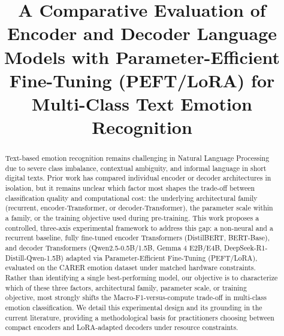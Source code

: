 \documentclass[conference]{IEEEtran}
\begin{document}
\title{A Comparative Evaluation of Encoder and Decoder Language Models with Parameter-Efficient Fine-Tuning (PEFT/LoRA) 
for Multi-Class Text Emotion Recognition
}

\author{
\and
{}
\and
{}
}

\maketitle

\begin{abstract}
Text-based emotion recognition remains challenging in Natural Language Processing due to severe class imbalance, contextual ambiguity, and informal language in short digital texts. Prior work has compared individual encoder or decoder architectures in isolation, but it remains unclear which factor most shapes the trade-off between classification quality and computational cost: the underlying architectural family (recurrent, encoder-Transformer, or decoder-Transformer), the parameter scale within a family, or the training objective used during pre-training. This work proposes a controlled, three-axis experimental framework to address this gap: a non-neural and a recurrent baseline, fully fine-tuned encoder Transformers (DistilBERT, BERT-Base), and decoder Transformers (Qwen2.5-0.5B/1.5B, Gemma 4 E2B/E4B, DeepSeek-R1-Distill-Qwen-1.5B) adapted via Parameter-Efficient Fine-Tuning (PEFT/LoRA), evaluated on the CARER emotion dataset under matched hardware constraints. Rather than identifying a single best-performing model, our objective is to characterize which of these three factors, architectural family, parameter scale, or training objective, most strongly shifts the Macro-F1-versus-compute trade-off in multi-class emotion classification. We detail this experimental design and its grounding in the current literature, providing a methodological basis for practitioners choosing between compact encoders and LoRA-adapted decoders under resource constraints.
\end{abstract}
\end{document}
